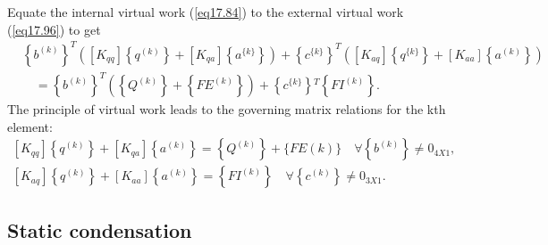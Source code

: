 \documentclass{AeroStructure-ERJohnson}
\begin{document}
Equate the internal virtual work (\ref{eq17.84}) to the external virtual work (\ref{eq17.96}) to get
\begin{align}\label{eq17.98}
&\left\{b^{(k)}\right\}^{T}\left(\left[K_{q q}\right]\left\{q^{(k)}\right\}+\left[K_{q a}\right]\left\{a^{\{k\}}\right\}\right)+\left\{c^{\{k\}}\right\}^{T}\left(\left[K_{a q}\right]\left\{q^{\{k\}}\right\}+\right. {\left.\left[K_{a a}\right]\left\{a^{(k)}\right\}\right)} \nonumber\\
&\quad =\left\{b^{(k)}\right\}^{T}\left(\left\{Q^{(k)}\right\}+\left\{F E^{(k)}\right\}\right)+\left\{c^{\{k\}}\right\}{ }^{T}\left\{F I^{(k)}\right\}.
\end{align}
The principle of virtual work leads to the governing matrix relations for the kth element:
\begin{gather}
\left[K_{q q}\right]\left\{q^{(k)}\right\}+\left[K_{q a}\right]\left\{a^{(k)}\right\}=\left\{Q^{(k)}\right\}+\{F E(k)\} \quad \boldsymbol{\forall}\left\{b^{(k)}\right\} \neq 0_{4 X 1}, \label{eq17.99} \\
\left[K_{a q}\right]\left\{q^{(k)}\right\}+\left[K_{a a}\right]\left\{a^{(k)}\right\}=\left\{F I^{(k)}\right\} \quad \boldsymbol{\forall}\left\{c^{(k)}\right\} \neq 0_{3 X 1}. \label{eq17.100}
\end{gather}



\subsection{Static condensation}\label{sec17.3.3}
\end{document}
